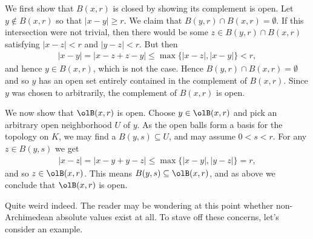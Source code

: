 \begin{prf}
	We first show that $B(x,r)$ is closed by showing its complement is open. Let $y \not \in B(x,r)$ so that $|x - y| \geq r$. We claim that $B(y,r) \cap B(x,r) = \emptyset$. If this intersection were not trivial, then there would be some $z \in B(y,r) \cap B(x,r)$ satisfying $|x - z| < r$ and $|y - z| < r$. But then
	\begin{align*}
	    |x - y| = |x - z + z - y| \leq \max\{|x - z|, |x - y|\} < r,
	\end{align*}
	and hence $y \in B(x,r)$, which is not the case. Hence $B(y,r) \cap B(x,r) = \emptyset$ and so $y$ has an open set entirely contained in the complement of $B(x,r)$. Since $y$ was chosen to arbitrarily, the complement of $B(x,r)$ is open.

	We now show that $\olB(x,r)$ is open. Choose $y \in \olB(x,r)$ and pick an arbitrary open neighborhood $U$ of $y$. As the open balls form a basis for the topology on $K$, we may find a $B(y,s) \subseteq U$, and may assume $0 < s < r$. For any $z \in B(y,s)$ we get
	\begin{align*}
		|x - z| = |x - y + y - z| \leq \max\{|x - y|, |y - z|\} = r,
	\end{align*}
	and so $z \in \olB(x,r)$. This means $B(y,s) \subseteq \olB(x,r)$, and as above we conclude that $\olB(x,r)$ is open.
\end{prf}
Quite weird indeed. The reader may be wondering at this point whether non-Archimedean absolute values exist at all. To stave off these concerns, let's consider an example.
